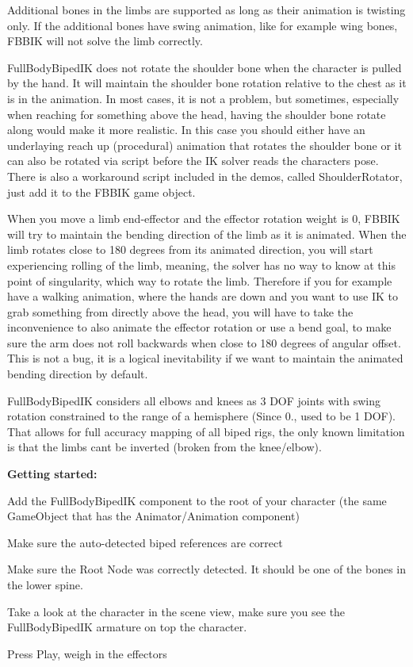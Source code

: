 \begin{DoxyItemize}
\item Additional bones in the limbs are supported as long as their animation is twisting only. If the additional bones have swing animation, like for example wing bones, F\+B\+B\+IK will not solve the limb correctly.
\item Full\+Body\+Biped\+IK does not rotate the shoulder bone when the character is pulled by the hand. It will maintain the shoulder bone rotation relative to the chest as it is in the animation. In most cases, it is not a problem, but sometimes, especially when reaching for something above the head, having the shoulder bone rotate along would make it more realistic. In this case you should either have an underlaying reach up (procedural) animation that rotates the shoulder bone or it can also be rotated via script before the IK solver reads the character\textquotesingle{}s pose. There is also a workaround script included in the demos, called Shoulder\+Rotator, just add it to the F\+B\+B\+IK game object.
\item When you move a limb end-\/effector and the effector rotation weight is 0, F\+B\+B\+IK will try to maintain the bending direction of the limb as it is animated. When the limb rotates close to 180 degrees from it\textquotesingle{}s animated direction, you will start experiencing rolling of the limb, meaning, the solver has no way to know at this point of singularity, which way to rotate the limb. Therefore if you for example have a walking animation, where the hands are down and you want to use IK to grab something from directly above the head, you will have to take the inconvenience to also animate the effector rotation or use a bend goal, to make sure the arm does not roll backwards when close to 180 degrees of angular offset. This is not a bug, it is a logical inevitability if we want to maintain the animated bending direction by default.
\item Full\+Body\+Biped\+IK considers all elbows and knees as 3 D\+OF joints with swing rotation constrained to the range of a hemisphere (Since 0., used to be 1 D\+OF). That allows for full accuracy mapping of all biped rigs, the only known limitation is that the limbs can\textquotesingle{}t be inverted (broken from the knee/elbow).
\end{DoxyItemize}

{\bfseries Getting started\+:}
\begin{DoxyItemize}
\item Add the Full\+Body\+Biped\+IK component to the root of your character (the same Game\+Object that has the Animator/\+Animation component)
\item Make sure the auto-\/detected biped references are correct
\item Make sure the Root Node was correctly detected. It should be one of the bones in the lower spine.
\item Take a look at the character in the scene view, make sure you see the Full\+Body\+Biped\+IK armature on top the character.
\item Press Play, weigh in the effectors
\end{DoxyItemize}

